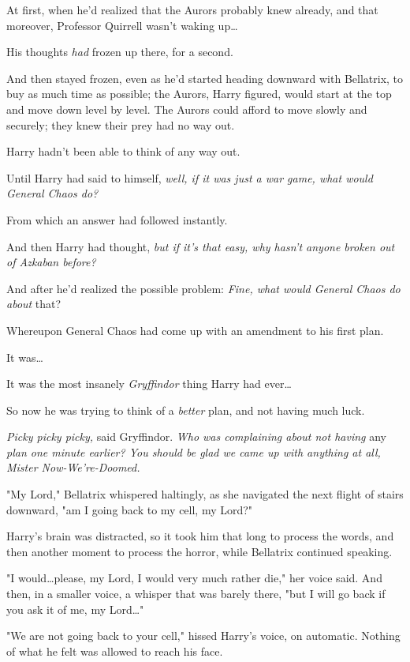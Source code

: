 At first, when he'd realized that the Aurors probably knew already, and that
moreover, Professor Quirrell wasn't waking up…

His thoughts \emph{had} frozen up there, for a second.

And then stayed frozen, even as he'd started heading downward with Bellatrix,
to buy as much time as possible; the Aurors, Harry figured, would
start at the top and move down level by level. The Aurors could afford to move
slowly and securely; they knew their prey had no way out.

Harry hadn't been able to think of any way out.

Until Harry had said to himself, \emph{well, if it was just a war game, what
would General Chaos do?}

From which an answer had followed instantly.

And then Harry had thought, \emph{but if it's \emph{that} easy, why hasn't
anyone broken out of Azkaban before?}

And after he'd realized the possible problem: \emph{Fine, what would General
Chaos do about} that?

Whereupon General Chaos had come up with an amendment to his first plan.

It was…

It was the most insanely \emph{Gryffindor} thing Harry had ever…

So now he was trying to think of a \emph{better} plan, and not having much luck.

\emph{Picky picky picky,} said Gryffindor. \emph{Who was complaining about not
having} any \emph{plan one minute earlier? You should be glad we came up with
anything at all, Mister Now-We're-Doomed.}

"My Lord," Bellatrix whispered haltingly, as she navigated the next flight of
stairs downward, "am I going back to my cell, my Lord?"

Harry's brain was distracted, so it took him that long to process the words,
and then another moment to process the horror, while Bellatrix continued
speaking.

"I would…please, my Lord, I would very much rather die," her voice
said. And then, in a smaller voice, a whisper that was barely there, "but I
will go back if you ask it of me, my Lord…"

"We are not going back to your cell," hissed Harry's voice, on automatic.
Nothing of what he felt was allowed to reach his face.

